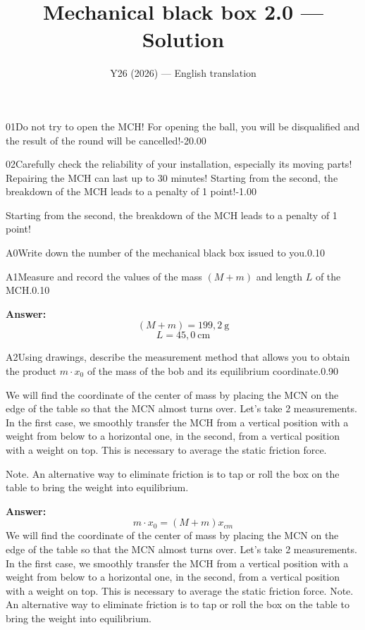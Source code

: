 \documentclass[11pt,a4paper]{article}
\title{\textbf{Mechanical black box 2.0 --- Solution}}
\author{\normalsize Y26 (2026) — English translation}
\date{}
\begin{document}
\maketitle\vspace{-0.5em}
\begin{solcard}{01}{Do not try to open the MCH! For opening the ball, you will be disqualified and the result of the round will be cancelled!}{-20.00}
\end{solcard}

\begin{solcard}{02}{Carefully check the reliability of your installation, especially its moving parts! Repairing the MCH can last up to 30 minutes! Starting from the second, the breakdown of the MCH leads to a penalty of 1 point!}{-1.00}

Starting from the second, the breakdown of the MCH leads to a penalty of 1 point!

\end{solcard}

\begin{solcard}{A0}{Write down the number of the mechanical black box issued to you.}{0.10}
\end{solcard}

\begin{solcard}{A1}{Measure and record the values of the mass $(M + m)$ and length $L$ of the MCH.}{0.10}
\par\smallskip\noindent\textbf{Answer:} $$(M+m) = 199,2 ~ \text{g}$$$$L = 45,0 ~ \text{cm}$$
\end{solcard}

\begin{solcard}{A2}{Using drawings, describe the measurement method that allows you to obtain the product $m \cdot x_0$ of the mass of the bob and its equilibrium coordinate.}{0.90}

We will find the coordinate of the center of mass by placing the MCN on the edge of the table so that the MCN almost turns over. Let's take 2 measurements. In the first case, we smoothly transfer the MCH from a vertical position with a weight from below to a horizontal one, in the second, from a vertical position with a weight on top. This is necessary to average the static friction force.


Note. An alternative way to eliminate friction is to tap or roll the box on the table to bring the weight into equilibrium.

\par\smallskip\noindent\textbf{Answer:} $$ m\cdot {x_0} = (M+m) x_{cm}$$ We will find the coordinate of the center of mass by placing the MCN on the edge of the table so that the MCN almost turns over. Let's take 2 measurements. In the first case, we smoothly transfer the MCH from a vertical position with a weight from below to a horizontal one, in the second, from a vertical position with a weight on top. This is necessary to average the static friction force. Note. An alternative way to eliminate friction is to tap or roll the box on the table to bring the weight into equilibrium.
\end{solcard}
\end{document}
